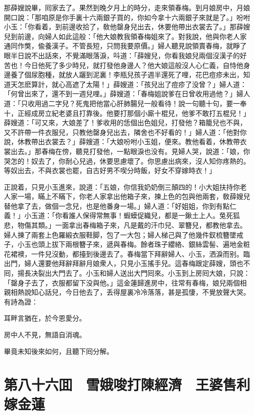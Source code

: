 那薛嫂說畢，囘家去了。果然到晚夕月上的時分，走來領春梅。到月娘房中，月娘開口說：「那咱原是你手裏十六兩銀子買的，你如今拿十六兩銀子來就是了。」吩咐小玉：「你看着，到前邊收拾了，敎他罄身兒出去，休要他帶出衣裳去了。」那薛嫂兒到前邊，向婦人如此這般：「他大娘教我領春梅姐來了。對我說，他與你老人家通同作獘，偸養漢子。不管長短，只問我要原價。」婦人聽見說領賣春梅，就睜了眼半日說不出話來，不覺滿眼落淚，呌道：「薛嫂兒，你看我娘兒兩個沒漢子的好苦也！今日他死了多少時兒，就打發他身邊人？他大娘這般沒人心仁義，自恃他身邊養了個尿胞種，就放人躧到泥裏！李瓶兒孩子週半還死了哩，花巴痘疹未出，知道天怎麽算計，就心高遮了太陽！」薛嫂道：「孩兒出了痘疹了没曾？」婦人道：「何曾出來了，還不到一週兒哩。」薛嫂道：「春梅姐說爹在日曾收用過他？」婦人道：「只收用過二字兒？死鬼把他當心肝肺腸兒一般看待！說一句聽十句，要一奉十，正經成房立紀老婆且打靠後。他要打那個小廝十棍兒，他爹不敢打五棍兒！」薛嫂道：「可又來，大娘差了！爹收用的恁個出色姐兒，打發他？箱籠兒也不與，又不許帶一件衣服兒，只教他罄身兒出去，隣舍也不好看的！」婦人道：「他對你說，休教帶出衣裳去？」薛嫂道：「大娘吩咐小玉姐，便來。教他看着，休教帶衣裳出去。」那春梅在傍，聽見打發他，一點眼淚也没有。見婦人哭，說道：「娘，你哭怎的！奴去了，你耐心兒過，休要思慮壞了。你思慮出病來，沒人知你疼熱的。等奴出去，不與衣裳也罷，自古好男不喫分時飯，好女不穿嫁時衣！」

正說着，只見小玉進來，說道：「五娘，你信我奶奶倒三顛四的！小大姐扶持你老人家一場，瞞上不瞞下，你老人家拿出他箱子來，揀上色的包與他兩套，敎薛嫂兒替他拿了去，做個一念兒，也是他番身一場。」婦人道：「好姐姐，你到有點仁義！」小玉道：「你看誰人保得常無事！蝦蟆促織兒，都是一鍬土上人。兔死狐悲，物傷其類。」一面拿出春梅箱子來，凡是戴的汗巾兒、翠簪兒，都教他拿去。婦人揀了兩套上色羅緞衣服鞋脚，包了一大包；婦人梯己與了他幾件釵梳簪墜戒子，小玉也頭上拔下兩根簪子來，遞與春梅。餘者珠子纓絡、銀絲雲髻、遍地金粧花裙襖，一件兒沒動，都擡到後邊去了。春梅當下拜辭婦人、小玉，洒淚而别。臨出門，婦人還要他拜辭拜辭月娘衆人，只見小玉搖手兒。這春梅跟定薛嫂，頭也不囘，揚長决裂出大門去了。小玉和婦人送出大門囘來。小玉到上房囘大娘，只說：「罄身子去了，衣服都留下没與他。」這金蓮歸進房中，往常有春梅，娘兒兩個相親相熱說知心話兒，今日他去了，丢得屋裏冷冷落落，甚是孤悽，不覺放聲大哭。有詩為證：

耳畔言猶在，於今恩愛分。

房中人不見，無語自消魂。

畢竟未知後來如何，且聽下囘分解。

\chapter*{第八十六囬　雪娥唆打陳經濟　王婆售利嫁金蓮}

